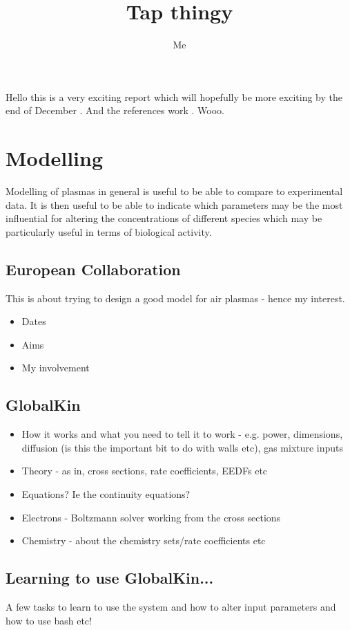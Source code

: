 \documentclass[11pt, oneside]{article}   	%
\title{Tap thingy}
\author{Me}
\begin{document}
\maketitle


Hello this is a very exciting report which will hopefully be more exciting by the end of December \cite{Weltmann2009}. And the references work \cite{Schroter2015atomic}. Wooo.

\section{Modelling}
Modelling of plasmas in general is useful to be able to compare to experimental data. 
It is then useful to be able to indicate which parameters may be the most influential for altering the concentrations of different species which may be particularly useful in terms of biological activity.
\subsection{European Collaboration}
This is about trying to design a good model for air plasmas - hence my interest.
\begin{itemize}
\item Dates
\item Aims
\item My involvement
\end{itemize}
\subsection{GlobalKin}
\begin{itemize}
\item How it works and what you need to tell it to work - e.g. power, dimensions, diffusion (is this the important bit to do with walls etc), gas mixture inputs
\item Theory - as in, cross sections, rate coefficients, EEDFs etc
\item Equations? Ie the continuity equations?
\item Electrons - Boltzmann solver working from the cross sections
\item Chemistry - about the chemistry sets/rate coefficients etc
\end{itemize}
\subsection{Learning to use GlobalKin...}
A few tasks to learn to use the system and how to alter input parameters and how to use bash etc! 
\end{document}
